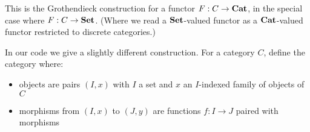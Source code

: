 \documentclass{acmart}
\begin{document}
\noindent This is the Grothendieck construction for a functor $F: C \to \mathbf{Cat}$, in the special case where $F: C
\to \mathbf{Set}$. (Where we read a $\mathbf{Set}$-valued functor as a $\mathbf{Cat}$-valued functor restricted to discrete
categories.)

In our code we give a slightly different construction. For a category $C$, define the category where:
\begin{itemize}
\item objects are pairs $(I, x)$ with $I$ a set and $x$ an $I$-indexed family of objects of $C$
\item morphisms from $(I, x)$ to $(J, y)$ are functions $f: I \to J$ paired with morphisms
\end{itemize}
\end{document}
